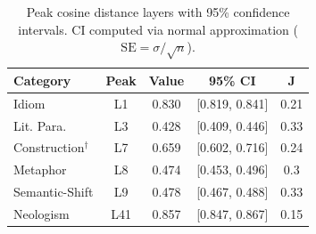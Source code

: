 \begin{table}[t]
\centering
\small
\begin{tabular}{lcccc}
\toprule
Category & Peak & Value & 95\% CI & J \\
\midrule
Idiom & L1 & 0.830 & [0.819, 0.841] & 0.21 \\
Lit. Para. & L3 & 0.428 & [0.409, 0.446] & 0.33 \\
Construction$^\dagger$ & L7 & 0.659 & [0.602, 0.716] & 0.24 \\
Metaphor & L8 & 0.474 & [0.453, 0.496] & 0.3 \\
Semantic-Shift & L9 & 0.478 & [0.467, 0.488] & 0.33 \\
Neologism & L41 & 0.857 & [0.847, 0.867] & 0.15 \\
\bottomrule
\end{tabular}
\caption{Peak cosine distance layers with 95\% confidence intervals. CI computed via normal approximation ($\text{SE} = \sigma/\sqrt{n}$).}
\label{tab:peak-ci}
\end{table}